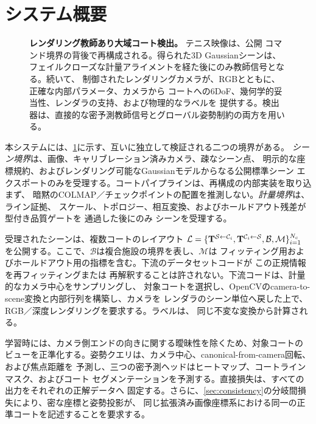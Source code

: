 \section{システム概要}
\label{sec:system}

\begin{figure}[t]
  \centering
  \resizebox{\linewidth}{!}{}
  \caption{\textbf{レンダリング教師あり大域コート検出。} テニス映像は、公開
  \NHT{}コマンド境界の背後で再構成される。得られた3D Gaussianシーンは、
  フェイルクローズな計量アライメントを経た後にのみ教師信号となる。続いて、
  制御されたレンダリングカメラが、RGBとともに、正確な内部パラメータ、カメラから
  コートへの6DoF、幾何学的妥当性、レンダラの支持、および物理的な\KP{}ラベルを
  提供する。検出器は、直接的な密予測教師信号とグローバル姿勢制約の両方を用いる。}
  \label{fig:system}
\end{figure}

本システムには、\cref{fig:system}に示す、互いに独立して検証される二つの境界がある。
\emph{シーン境界}は、画像、キャリブレーション済みカメラ、疎なシーン点、
明示的な座標規約、およびレンダリング可能なGaussianモデルからなる公開標準シーン
エクスポートのみを受理する。コートパイプラインは、再構成の内部実装を取り込まず、
暗黙のCOLMAP／チェックポイントの配置を推測しない。\emph{計量境界}は、ライン証拠、
スケール、トポロジー、相互変換、およびホールドアウト残差が型付き品質ゲートを
通過した後にのみ
シーンを受理する。

受理されたシーンは、複数コートのレイアウト
\(
  \mathcal{L}=\{\mathbf{T}^{\mathcal{S}\leftarrow \mathcal{C}_i},
  \mathbf{T}^{\mathcal{C}_i\leftarrow \mathcal{S}},\mathcal{B},\mathcal{M}\}_{i=1}^{N_c}
\)
を公開する。ここで、\(\mathcal{B}\)は複合施設の境界を表し、\(\mathcal{M}\)は
フィッティング用およびホールドアウト用の指標を含む。下流のデータセットコードが
この正規情報を再フィッティングまたは
再解釈することは許されない。下流コードは、計量的なカメラ中心をサンプリングし、
対象コートを選択し、OpenCVのcamera-to-scene変換と内部行列を構築し、カメラを
レンダラのシーン単位へ戻した上で、RGB／深度レンダリングを要求する。ラベルは、
同じ不変な変換から計算される。

学習時には、カメラ側エンドの向きに関する曖昧性を除くため、対象コートの
ビューを正準化する。姿勢クエリは、カメラ中心、canonical-from-camera回転、および焦点距離を
予測し、三つの密予測ヘッドは\KP{}ヒートマップ、コートラインマスク、およびコート
セグメンテーションを予測する。直接損失は、すべての出力をそれぞれの正解データへ
固定する。さらに、\cref{sec:consistency}の分岐間損失により、密な座標と姿勢投影が、
同じ拡張済み画像座標系における同一の正準コートを記述することを要求する。


